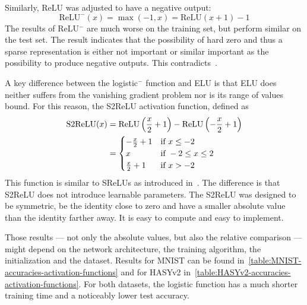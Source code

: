 Similarly, \gls{ReLU} was adjusted to have a negative output:
\[\text{ReLU}^{-}(x) = \max(-1, x) = \text{ReLU}(x+1) - 1\]
The results of \gls{ReLU}$^-$ are much worse on the training set, but perform
similar on the test set. The result indicates that the possibility of hard zero
and thus a sparse representation is either not important or similar important as
the possibility to produce negative outputs. This
contradicts~\cite{glorot2011deep,srivastava2014understanding}.

A key difference between the logistic$^-$ function and \gls{ELU} is that
\gls{ELU} does neither suffers from the vanishing gradient problem nor is its
range of values bound. For this reason, the S2ReLU activation function, defined
as
\begin{align*}
  \operatorname*{S2ReLU}(x) &= \operatorname*{ReLU} \left (\frac{x}{2} + 1 \right ) - \operatorname*{ReLU} \left (-\frac{x}{2} + 1 \right)\\
  &=
  \begin{cases}-\frac{x}{2} + 1 &\text{if } x \le -2\\
               x &\text{if } -2\le x \le 2\\
               \frac{x}{2} + 1&\text{if } x > -2\end{cases}
\end{align*}
This function is similar to SReLUs as introduced in~\cite{jin2016deep}. The
difference is that S2ReLU does not introduce learnable parameters. The S2ReLU
was designed to be symmetric, be the identity close to zero and have a smaller
absolute value than the identity farther away. It is easy to compute and easy to
implement.

Those results --- not only the absolute values, but also the relative
comparison --- might depend on the network architecture, the training
algorithm, the initialization and the dataset. Results for MNIST can be found
in~\cref{table:MNIST-accuracies-activation-functions} and for HASYv2
in~\cref{table:HASYv2-accuracies-activation-functions}. For both datasets, the
logistic function has a much shorter training time and a noticeably lower test
accuracy.

